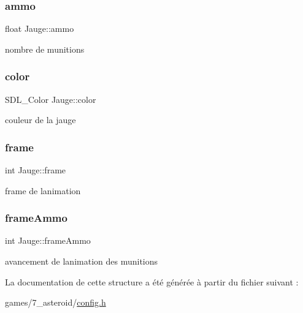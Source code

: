 \subsubsection{\texorpdfstring{ammo}{ammo}}
{\footnotesize\ttfamily float Jauge\+::ammo}



nombre de munitions 

\mbox{\label{struct_jauge_a5426eef58429780fbfcd74f0a4b72eca}} 
\subsubsection{\texorpdfstring{color}{color}}
{\footnotesize\ttfamily S\+D\+L\+\_\+\+Color Jauge\+::color}



couleur de la jauge 

\mbox{\label{struct_jauge_a8d53c17b4c6d0dd90238f7abd4e29bfe}} 
\subsubsection{\texorpdfstring{frame}{frame}}
{\footnotesize\ttfamily int Jauge\+::frame}



frame de l\textquotesingle{}animation 

\mbox{\label{struct_jauge_ab961d6e627fdeb351ece38dbe069564e}} 
\subsubsection{\texorpdfstring{frame\+Ammo}{frameAmmo}}
{\footnotesize\ttfamily int Jauge\+::frame\+Ammo}



avancement de l\textquotesingle{}animation des munitions 



La documentation de cette structure a été générée à partir du fichier suivant \+:\begin{DoxyCompactItemize}
\item 
games/7\+\_\+asteroid/\hyperlink{7__asteroid_2config_8h}{config.\+h}\end{DoxyCompactItemize}
